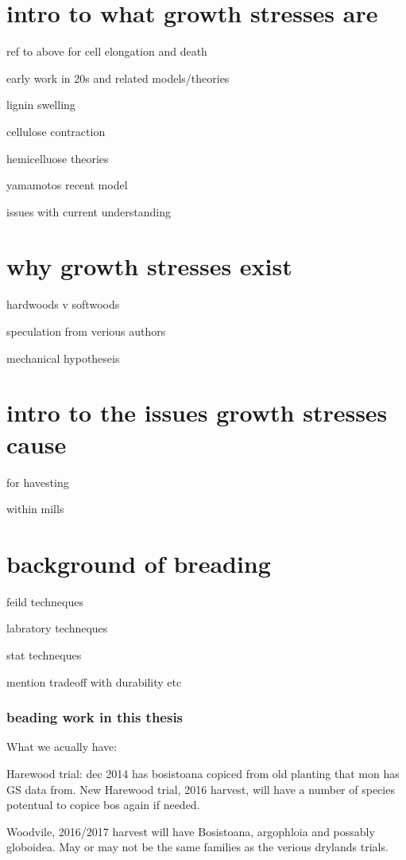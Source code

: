 \documentclass{article}
\begin{document}
\section{intro to what growth stresses are}

ref to above for cell elongation and death

early work in 20s and related models/theories

lignin swelling

cellulose contraction

hemicelluose theories

yamamotos recent model

issues with current understanding



\section{why growth stresses exist}

hardwoods v softwoods

speculation from verious authors

mechanical hypotheseis

\section{intro to the issues growth stresses cause }

for havesting

within mills

\section{background of breading}

feild techneques

labratory techneques

stat techneques

mention tradeoff with durability etc

\subsubsection{beading work in this thesis}
What we acually have:

Harewood trial:
dec 2014 has bosistoana copiced from old planting that mon has GS data from.
New Harewood trial, 2016 harvest, will have a number of species potentual to copice bos again if needed.

Woodvile, 2016/2017 harvest will have Bosistoana, argophloia and possably globoidea.
May or may not be the same families as the verious drylands trials.
\end{document}
